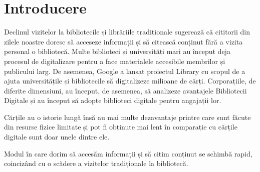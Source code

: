 \clearpage
\section*{Introducere}

Declinul vizitelor la bibliotecile și librăriile tradiționale sugerează că
cititorii din zilele noastre doresc să acceseze informații și să citească
conținut fără a vizita personal o bibliotecă. Multe biblioteci și universități
mari au început deja procesul de digitalizare pentru a face materialele
accesibile membrilor și publicului larg. De asemenea, Google a lansat proiectul
Library cu scopul de a ajuta universitățile și bibliotecile să digitalizeze
milioane de cărți. Corporațiile, de diferite dimensiuni, au început, de
asemenea, să analizeze avantajele Bibliotecii Digitale și au început să adopte
biblioteci digitale pentru angajații lor.

Cărțile au o istorie lungă însă au mai multe dezavantaje printre care sunt
făcute din resurse fizice limitate și pot fi obținute mai lent în comparație cu
cărțile digitale sunt doar unele dintre ele.

Modul în care dorim să accesăm
informații și să citim conținut se schimbă rapid, coincizând cu o scădere a
vizitelor tradiționale la bibliotecă.

